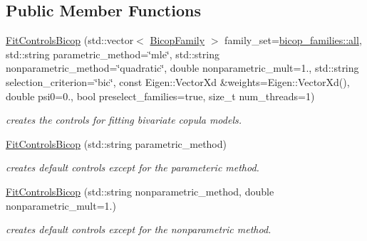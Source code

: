 \subsection*{Public Member Functions}
\begin{DoxyCompactItemize}
\item 
\hyperlink{classvinecopulib_1_1_fit_controls_bicop_a20f51de5d89278679c2c9aa2bac2a36e}{Fit\+Controls\+Bicop} (std\+::vector$<$ \hyperlink{namespacevinecopulib_a42e95cc06d33896199caab0c11ad44f3}{Bicop\+Family} $>$ family\+\_\+set=\hyperlink{namespacevinecopulib_1_1bicop__families_a5214a513f41ec23b74782aab96ea6774}{bicop\+\_\+families\+::all}, std\+::string parametric\+\_\+method=\char`\"{}mle\char`\"{}, std\+::string nonparametric\+\_\+method=\char`\"{}quadratic\char`\"{}, double nonparametric\+\_\+mult=1., std\+::string selection\+\_\+criterion=\char`\"{}bic\char`\"{}, const Eigen\+::\+Vector\+Xd \&weights=Eigen\+::\+Vector\+Xd(), double psi0=0., bool preselect\+\_\+families=true, size\+\_\+t num\+\_\+threads=1)
\begin{DoxyCompactList}\small\item\em creates the controls for fitting bivariate copula models. \end{DoxyCompactList}\item 
\hyperlink{classvinecopulib_1_1_fit_controls_bicop_a6a2fc00794c9dd9d598ac9948e7b98e4}{Fit\+Controls\+Bicop} (std\+::string parametric\+\_\+method)
\begin{DoxyCompactList}\small\item\em creates default controls except for the parameteric method. \end{DoxyCompactList}\item 
\hyperlink{classvinecopulib_1_1_fit_controls_bicop_ae87a80323e8f5d3702ab0db42bf8bcb5}{Fit\+Controls\+Bicop} (std\+::string nonparametric\+\_\+method, double nonparametric\+\_\+mult=1.)
\begin{DoxyCompactList}\small\item\em creates default controls except for the nonparametric method. \end{DoxyCompactList}\end{DoxyCompactItemize}
